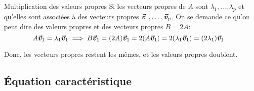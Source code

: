 \documentclass[a4paper]{article}
\begin{document}
\begin{parag}{Multiplication des valeurs propres}
    Si les vecteurs propres de $A$ sont $\lambda_1, \ldots, \lambda_p$ et qu'elles sont associées à des vecteurs propres $\bm{\protect\vec{v}}_1, \ldots, \bm{\protect\vec{v}}_p$. On se demande ce qu'on peut dire des valeurs propres et des vecteurs propres $B = 2A$:
    \[A \bvec{v}_1 = \lambda_1 \bvec{v}_1 \implies B \bvec{v}_1 = \left(2A\right)\bvec{v}_1 = 2\left(A \bvec{v}_1\right) = 2\left(\lambda_1 \bvec{v}_1\right) = \left(2\lambda_1\right)\bvec{v}_1\]
    
    Donc, les vecteurs propres restent les mêmes, et les valeurs propres doublent.
\end{parag}

\subsection{Équation caractéristique}
\end{document}
